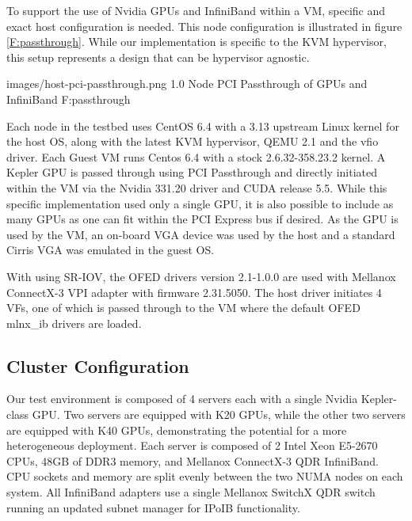 \documentclass{sigplanconf}
\begin{document}
To support the use of Nvidia GPUs and InfiniBand within a VM, specific and exact host configuration is needed. This node configuration is illustrated in figure \ref{F:passthrough}.  While our implementation is specific to the KVM hypervisor, this setup represents a design that can be hypervisor agnostic.

  {images/host-pci-passthrough.png}
  {1.0}
  {Node PCI Passthrough of GPUs and InfiniBand}
  {F:passthrough}


Each node in the testbed uses CentOS 6.4 with a 3.13 upstream Linux kernel for the host OS, along with the latest KVM hypervisor, QEMU 2.1 and the vfio driver.  Each Guest VM runs Centos 6.4 with a stock 2.6.32-358.23.2 kernel. A Kepler GPU is passed through using PCI Passthrough and directly initiated within the VM via the Nvidia 331.20 driver and CUDA release 5.5. While this specific implementation used only a single GPU, it is also possible to include as many GPUs as one can fit within the PCI Express bus if desired. As the GPU is used by the VM, an on-board VGA device was used by the host and a standard Cirris VGA was emulated in the guest OS. 

With using SR-IOV, the OFED drivers version 2.1-1.0.0 are used with Mellanox ConnectX-3 VPI adapter with firmware 2.31.5050.  The host driver initiates 4 VFs, one of which is passed through to the VM where the default OFED mlnx\_ib drivers are loaded.  




\subsection{Cluster Configuration}

Our test environment is composed of 4 servers each with a single Nvidia Kepler-class GPU.  Two servers are equipped with K20 GPUs, while the other two servers are equipped with K40 GPUs, demonstrating the potential for a more heterogeneous deployment.  Each server is composed of 2 Intel Xeon E5-2670 CPUs, 48GB of DDR3 memory, and Mellanox ConnectX-3 QDR InfiniBand.  CPU sockets and memory are split evenly between the two NUMA nodes on each system. All InfiniBand adapters use a single Mellanox SwitchX QDR switch running an updated subnet manager for IPoIB functionality.   
\end{document}
